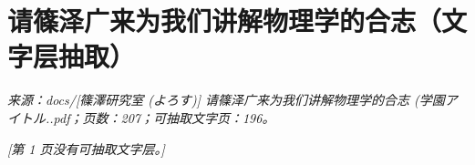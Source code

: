 \chapter*{请篠泽广来为我们讲解物理学的合志（文字层抽取）}
\begingroup\small
\noindent\textit{来源：docs/[篠澤研究室 (よろす)] 请篠泽广来为我们讲解物理学的合志 (学園アイトル..pdf；页数：207；可抽取文字页：196。}\par
\endgroup
\medskip
\begingroup
\setlength{\parindent}{0pt}
\setlength{\parskip}{0.45em}

\noindent\textit{[第 1 页没有可抽取文字层。]}\par

